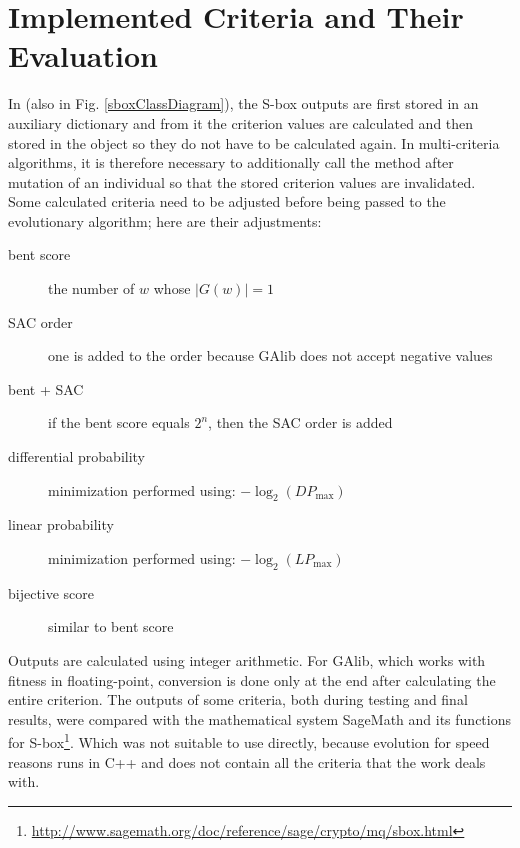 \section{Implemented Criteria and Their Evaluation}

In  (also in Fig. \ref{sboxClassDiagram}), the S-box outputs are first stored in an auxiliary dictionary
and from it the criterion values are calculated and then stored in the object so they do not have to be
calculated again.
In multi-criteria algorithms, it is therefore necessary to additionally call the method  after mutation
of an individual so that the stored criterion values are invalidated.
Some calculated criteria need to be adjusted before being passed to the evolutionary algorithm; here are
their adjustments:
\begin{description}
  \item[bent score] the number of $w$ whose $|G(w)| = 1$
  \item[SAC order] one is added to the order because GAlib does not accept negative values
  \item[bent + SAC] if the bent score equals $2^n$, then the SAC order is added
  \item[differential probability] minimization performed using: $-\log_2(DP_{\max})$
  \item[linear probability] minimization performed using: $-\log_2(LP_{\max})$
  \item[bijective score] similar to bent score
\end{description}
Outputs are calculated using integer arithmetic. For GAlib, which works with
fitness in floating-point, conversion is done only at the end after calculating the entire criterion.
The outputs of some criteria, both during testing and final results, were compared with the mathematical
system SageMath and its functions for S-box\footnote{\url{http://www.sagemath.org/doc/reference/sage/crypto/mq/sbox.html}}.
Which was not suitable to use directly, because evolution for speed reasons runs in C++ and does not contain all
the criteria that the work deals with.

